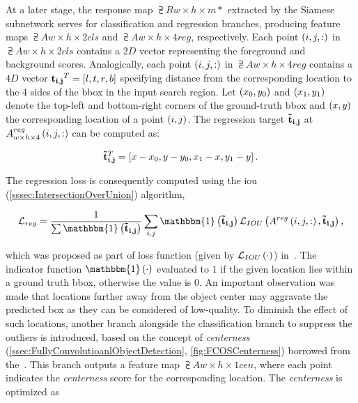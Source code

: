 At a later stage, the response map $\supsub{R}{w \times h \times m}{*}$ extracted by the Siamese subnetwork serves for classification and regression branches, producing feature maps $\supsub{A}{w \times h \times 2}{cls}$ and $\supsub{A}{w \times h \times 4}{reg}$, respectively. Each point $\left( {i, j, :} \right)$ in $\supsub{A}{w \times h \times 2}{cls}$ contains a $2D$ vector representing the foreground and background scores. Analogically, each point $\left( {i, j, :} \right)$ in $\supsub{A}{w \times h \times 4}{reg}$ contains a $4D$ vector ${\mathbf{t_{i, j}}}^T = \left[ {l, t, r, b} \right]$ specifying distance from the corresponding location to the $4$ sides of the \gls{bbox} in the input search region. Let $\left( {x_0, y_0} \right)$ and $\left( {x_1, y_1} \right)$ denote the top-left and bottom-right corners of the ground-truth \gls{bbox} and $\left( {x, y} \right)$ the corresponding location of a point $\left( {i, j} \right)$. The regression target $\mathbf{\tilde{t}_{i, j}}$ at ${A}_{w \times h \times 4}^{reg} \left( {i, j, :} \right)$ can be computed as:

\begin{equation}
    {\mathbf{\tilde{t}_{i, j}}}^T = \left[ {x - x_0, y - y_0, x_1 - x, y_1 - y} \right].
\end{equation}

\noindent The regression loss is consequently computed using the \gls{iou} (\cref{sssec:IntersectionOverUnion}) algorithm,

\begin{equation}
    \label{eq:SiamCARRegLoss}
    \mathcal{L}_{reg} =
    \frac{1}{\sum \func{\mathbbm{1}}{\vect{\tilde{t}_{i, j}}}}
    \sum_{i, j}
    \func{\mathbbm{1}}{\vect{\tilde{t}_{i, j}}}
    \func{\mathcal{L}_{IOU}}{\func{A^{reg}}{i, j, :}, \vect{\tilde{t}_{i, j}}},
\end{equation}

which was proposed as part of loss function (given by ${\mathcal{L}_{IOU}} \left( \cdot \right)$) in~\cite{Yu2016}. The indicator function $\func{\mathbbm{1}}{\cdot}$ evaluated to $1$ if the given location lies within a ground truth \gls{bbox}, otherwise the value is $0$. An important observation was made that locations further away from the object center may aggravate the predicted box as they can be considered of low-quality. To diminish the effect of such locations, another branch alongside the classification branch to suppress the outliers is introduced, based on the concept of \emph{centerness} (\cref{ssec:FullyConvolutioanlObjectDetection}, \cref{fig:FCOSCenterness}) borrowed from the~\cite{Tian2019}. This branch outputs a feature map $\supsub{A}{w \times h \times 1}{cen}$, where each point indicates the \emph{centerness} score for the corresponding location. The \emph{centerness} is optimized as

